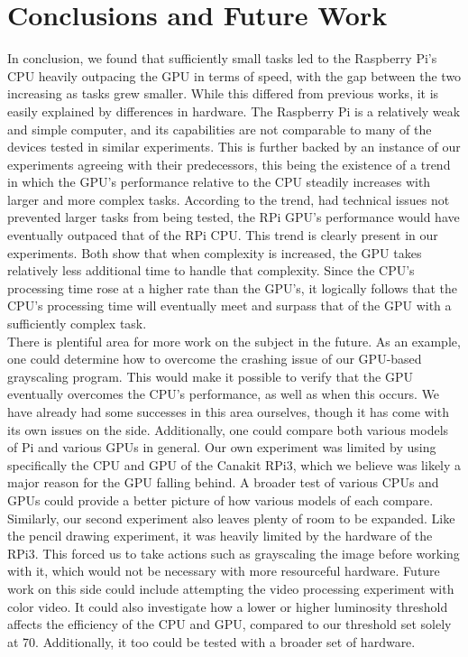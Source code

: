 \documentclass[conference]{IEEEtran}
\begin{document}
\section{Conclusions and Future Work}
In conclusion, we found that sufficiently small tasks led to the Raspberry Pi's CPU heavily outpacing the GPU in terms of speed, with the gap between the two increasing as tasks grew smaller. While this differed from previous works, it is easily explained by differences in hardware. The Raspberry Pi is a relatively weak and simple computer, and its capabilities are not comparable to many of the devices tested in similar experiments. This is further backed by an instance of our experiments agreeing with their predecessors, this being the existence of a trend in which the GPU's performance relative to the CPU steadily increases with larger and more complex tasks. According to the trend, had technical issues not prevented larger tasks from being tested, the RPi GPU's performance would have eventually outpaced that of the RPi CPU. This trend is clearly present in our experiments. Both show that when complexity is increased, the GPU takes relatively less additional time to handle that complexity. Since the CPU's processing time rose at a higher rate than the GPU's, it logically follows that the CPU's processing time will eventually meet and surpass that of the GPU with a sufficiently complex task.\\
There is plentiful area for more work on the subject in the future. As an example, one could determine how to overcome the crashing issue of our GPU-based grayscaling program. This would make it possible to verify that the GPU eventually overcomes the CPU's performance, as well as when this occurs. We have already had some successes in this area ourselves, though it has come with its own issues on the side. Additionally, one could compare both various models of Pi and various GPUs in general. Our own experiment was limited by using specifically the CPU and GPU of the Canakit RPi3, which we believe was likely a major reason for the GPU falling behind. A broader test of various CPUs and GPUs could provide a better picture of how various models of each compare.\\
Similarly, our second experiment also leaves plenty of room to be expanded. Like the pencil drawing experiment, it was heavily limited by the hardware of the RPi3. This forced us to take actions such as grayscaling the image before working with it, which would not be necessary with more resourceful hardware. Future work on this side could include attempting the video processing experiment with color video. It could also investigate how a lower or higher luminosity threshold affects the efficiency of the CPU and GPU, compared to our threshold set solely at 70. Additionally, it too could be tested with a broader set of hardware.



\newpage


\end{document}
